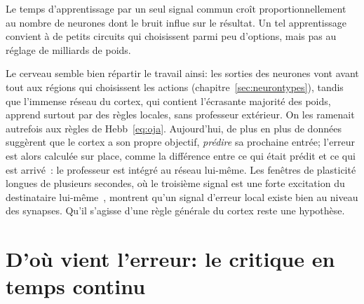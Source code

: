 \begin{keyblock}
\begin{proposition}
\label{prop:broadcastcost}
Le temps d'apprentissage par un seul signal commun croît proportionnellement au nombre de neurones dont le bruit influe sur le résultat. Un tel apprentissage convient à de petits circuits qui choisissent parmi peu d'options, mais pas au réglage de milliards de poids.
\end{proposition}
\end{keyblock}

Le cerveau semble bien répartir le travail ainsi: les sorties des neurones  vont avant tout aux régions qui choisissent les actions (chapitre~\ref{sec:neurontypes}), tandis que l'immense réseau  du cortex, qui contient l'écrasante majorité des poids, apprend surtout par des règles locales, sans professeur extérieur. On les ramenait autrefois aux règles de Hebb~\eqref{eq:oja}. Aujourd'hui, de plus en plus de données suggèrent que le cortex a son propre objectif, \emph{prédire} sa prochaine entrée; l'erreur est alors calculée sur place, comme la différence entre ce qui était prédit et ce qui est arrivé~\cite{Keller2018}: le professeur est intégré au réseau lui-même. Les fenêtres de plasticité longues de plusieurs secondes, où le troisième signal est une forte excitation du destinataire lui-même~\cite{Bittner2017}, montrent qu'un signal d'erreur local existe bien au niveau des synapses. Qu'il s'agisse d'une règle générale du cortex reste une hypothèse.

\section{D'où vient l'erreur: le critique en temps continu}

